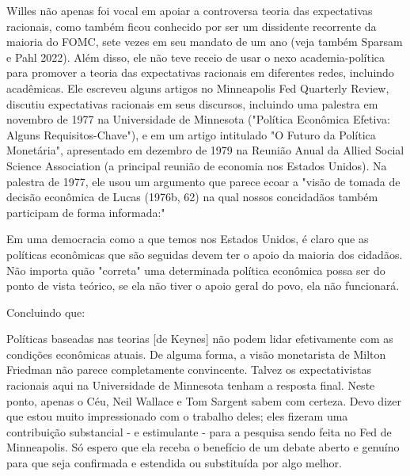 \documentclass[a4paper,12pt]{article}[abntex2]
\begin{document}
Willes não apenas foi vocal em apoiar a controversa teoria das expectativas racionais, como também ficou conhecido por ser um dissidente recorrente da maioria do FOMC, sete vezes em seu mandato de um ano (veja também Sparsam e Pahl 2022). Além disso, ele não teve receio de usar o nexo academia-política para promover a teoria das expectativas racionais em diferentes redes, incluindo acadêmicas. Ele escreveu alguns artigos no Minneapolis Fed Quarterly Review, discutiu expectativas racionais em seus discursos, incluindo uma palestra em novembro de 1977 na Universidade de Minnesota ("Política Econômica Efetiva: Alguns Requisitos-Chave"), e em um artigo intitulado "O Futuro da Política Monetária", apresentado em dezembro de 1979 na Reunião Anual da Allied Social Science Association (a principal reunião de economia nos Estados Unidos). Na palestra de 1977, ele usou um argumento que parece ecoar a "visão de tomada de decisão econômica de Lucas (1976b, 62) na qual nossos concidadãos também participam de forma informada:"

Em uma democracia como a que temos nos Estados Unidos, é claro que as políticas econômicas que são seguidas devem ter o apoio da maioria dos cidadãos. Não importa quão "correta" uma determinada política econômica possa ser do ponto de vista teórico, se ela não tiver o apoio geral do povo, ela não funcionará.

Concluindo que:

Políticas baseadas nas teorias [de Keynes] não podem lidar efetivamente com as condições econômicas atuais. De alguma forma, a visão monetarista de Milton Friedman não parece completamente convincente. Talvez os expectativistas racionais aqui na Universidade de Minnesota tenham a resposta final. Neste ponto, apenas o Céu, Neil Wallace e Tom Sargent sabem com certeza. Devo dizer que estou muito impressionado com o trabalho deles; eles fizeram uma contribuição substancial - e estimulante - para a pesquisa sendo feita no Fed de Minneapolis. Só espero que ela receba o benefício de um debate aberto e genuíno para que seja confirmada e estendida ou substituída por algo melhor.
\end{document}
